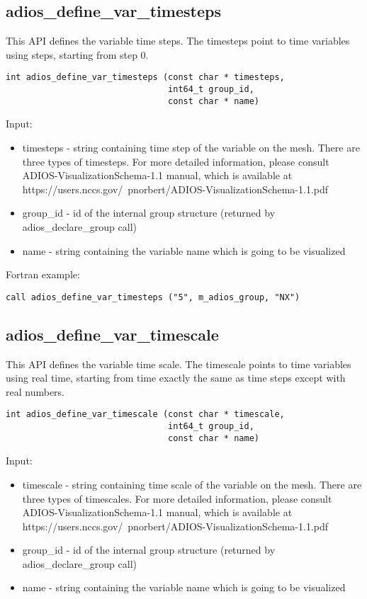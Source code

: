 \subsection{adios\_define\_var\_timesteps}
This API defines the variable time steps. The timesteps point to time variables using steps, 
starting from step 0.


\begin{lstlisting}[alsolanguage=C,caption={},label={}]
int adios_define_var_timesteps (const char * timesteps, 
                                int64_t group_id, 
                                const char * name)
\end{lstlisting}

Input:
\begin{itemize}
\item timesteps - string containing time step of the variable on the mesh. There are three types of
timesteps. For more detailed information, please consult ADIOS-VisualizationSchema-1.1 manual,
which is available at https://users.nccs.gov/~pnorbert/ADIOS-VisualizationSchema-1.1.pdf
\item group\_id - id of the internal group structure (returned by adios\_declare\_group call)
\item name - string containing the variable name which is going to be visualized
\end{itemize}

Fortran example:
\begin{lstlisting}[alsolanguage=Fortran,caption={},label={}]
call adios_define_var_timesteps ("5", m_adios_group, "NX")
\end{lstlisting}


\subsection{adios\_define\_var\_timescale}
This API defines the variable time scale. The timescale points to time variables using real time, 
starting from time exactly the same as time steps except with real numbers. 

\begin{lstlisting}[alsolanguage=C,caption={},label={}]
int adios_define_var_timescale (const char * timescale, 
                                int64_t group_id, 
                                const char * name)
\end{lstlisting}

Input:
\begin{itemize}
\item timescale - string containing time scale of the variable on the mesh. There are three types of
timescales. For more detailed information, please consult ADIOS-VisualizationSchema-1.1 manual,
which is available at https://users.nccs.gov/~pnorbert/ADIOS-VisualizationSchema-1.1.pdf
\item group\_id - id of the internal group structure (returned by adios\_declare\_group call)
\item name - string containing the variable name which is going to be visualized
\end{itemize}

